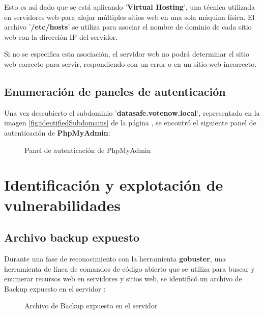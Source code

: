 \documentclass[a4paper]{article} %
\begin{document}
  \vspace{0.3cm}
  Esto es así dado que se está aplicando '\textbf{Virtual Hosting}', una técnica utilizada en servidores web para 
  alojar múltiples sitios web en una sola máquina física. El archivo '\textbf{/etc/hosts}' se utiliza para asociar el nombre 
  de dominio de cada sitio web con la dirección IP del servidor.

  Si no se especifica esta asociación, el servidor web no podrá determinar el sitio web correcto para servir, respondiendo 
  con un error o en un sitio web incorrecto.

  \clearpage 
  \subsection{Enumeración de paneles de autenticación}
  
  Una vez descubierto el subdominio '\textbf{datasafe.votenow.local}', representado en la imagen \ref{fig:identifiedSubdomains} 
  de la página \pageref{fig:identifiedSubdomains}, se encontró el siguiente panel de autenticación de \textbf{PhpMyAdmin}:

  \vspace{0.2cm} 
  \begin{figure}[h]
    \centering 
    \setlength{\fboxrule}{0.8pt}  
    \caption{Panel de autenticación de PhpMyAdmin}
    \label{fig:phpmyadmin}
  \end{figure}

  \section{Identificación y explotación de vulnerabilidades}
  \subsection{Archivo backup expuesto}

  Durante una fase de reconocimiento con la herramienta \textbf{gobuster}, una herramienta de línea de comandos de código abierto 
  que se utiliza para buscar y enumerar recursos web en servidores y sitios web, se identificó un archivo de Backup expuesto en el 
  servidor : 
 
  \begin{figure}[h]
    \centering 
    \setlength{\fboxrule}{0.8pt}  
    \caption{Archivo de Backup expuesto en el servidor}
  \end{figure}
  
\end{document}
